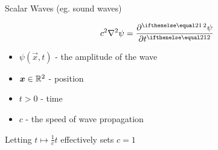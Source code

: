 Scalar Waves (eg. sound waves)

$$c^2 \nabla^2 \psi = \pder[2]{\psi}{t}$$

\begin{itemize}
    \item $\psi(\vec{x},t)$ - the amplitude of the wave
    \item $\bm{x} \in \mathbb{R}^2$ - position
    \item $t > 0$ - time
    \item $c$ - the speed of wave propagation
\end{itemize}

Letting $t \mapsto \frac{1}{c} t$ effectively sets $c = 1$